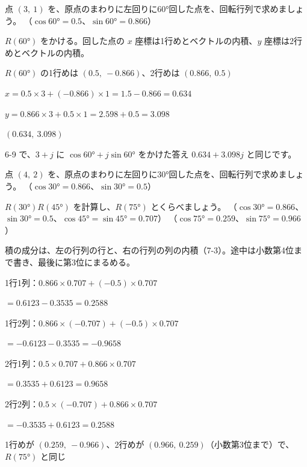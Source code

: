 
\begin{reidai}[点を回す]
点 $(3,\ 1)$ を、原点のまわりに左回りに60°回した点を、回転行列で求めましょう。\newline
（$\cos60°=0.5$、$\sin60°=0.866$）\par
\kangaekata $R(60°)$ をかける。回した点の $x$ 座標は1行めとベクトルの内積、$y$ 座標は2行めとベクトルの内積。\par
\shiki $R(60°)$ の1行めは $(0.5,\ -0.866)$、2行めは $(0.866,\ 0.5)$\par
\kviigq $x=0.5\times3+(-0.866)\times1=1.5-0.866=0.634$\par
\kviigq $y=0.866\times3+0.5\times1=2.598+0.5=3.098$\par
\kotae $(0.634,\ 3.098)$
\end{reidai}
6-9 で、$3+j$ に $\cos60°+j\sin60°$ をかけた答え $0.634+3.098j$ と同じです。

\begin{jibun}
点 $(4,\ 2)$ を、原点のまわりに左回りに30°回した点を、回転行列で求めましょう。\newline
（$\cos30°=0.866$、$\sin30°=0.5$）
\end{jibun}

\begin{reidai}[回転をつなぐ]
$R(30°)R(45°)$ を計算し、$R(75°)$ とくらべましょう。\newline
（$\cos30°=0.866$、$\sin30°=0.5$、$\cos45°=\sin45°=0.707$）\newline
（$\cos75°=0.259$、$\sin75°=0.966$）\par
\kangaekata 積の成分は、左の行列の行と、右の行列の列の内積（7-3）。途中は小数第4位まで書き、最後に第3位にまるめる。\par
\shiki 1行1列：$0.866\times0.707+(-0.5)\times0.707$\par
\kviigq \phantom{1行1列：}${}=0.6123-0.3535=0.2588$\par
\kviigq 1行2列：$0.866\times(-0.707)+(-0.5)\times0.707$\par
\kviigq \phantom{1行2列：}${}=-0.6123-0.3535=-0.9658$\par
\kviigq 2行1列：$0.5\times0.707+0.866\times0.707$\par
\kviigq \phantom{2行1列：}${}=0.3535+0.6123=0.9658$\par
\kviigq 2行2列：$0.5\times(-0.707)+0.866\times0.707$\par
\kviigq \phantom{2行2列：}${}=-0.3535+0.6123=0.2588$\par
\kotae 1行めが $(0.259,\ -0.966)$、2行めが $(0.966,\ 0.259)$（小数第3位まで）で、$R(75°)$ と同じ
\end{reidai}

